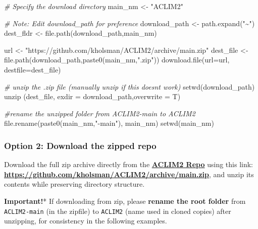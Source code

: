 \documentclass[
]{article}
\newenvironment{Shaded}{\begin{snugshade}}{\end{snugshade}}
\newcommand{\AttributeTok}[1]{\textcolor[rgb]{0.77,0.63,0.00}{#1}}
\newcommand{\CommentTok}[1]{\textcolor[rgb]{0.56,0.35,0.01}{\textit{#1}}}
\newcommand{\FunctionTok}[1]{\textcolor[rgb]{0.00,0.00,0.00}{#1}}
\newcommand{\NormalTok}[1]{#1}
\newcommand{\OtherTok}[1]{\textcolor[rgb]{0.56,0.35,0.01}{#1}}
\newcommand{\StringTok}[1]{\textcolor[rgb]{0.31,0.60,0.02}{#1}}
\begin{document}
\begin{Shaded}
\begin{Highlighting}[]
    \CommentTok{\# Specify the download directory}
\NormalTok{    main\_nm       }\OtherTok{\textless{}{-}} \StringTok{"ACLIM2"}

    \CommentTok{\# Note: Edit download\_path for preference}
\NormalTok{    download\_path }\OtherTok{\textless{}{-}}  \FunctionTok{path.expand}\NormalTok{(}\StringTok{"\textasciitilde{}"}\NormalTok{)}
\NormalTok{    dest\_fldr     }\OtherTok{\textless{}{-}} \FunctionTok{file.path}\NormalTok{(download\_path,main\_nm)}
    
\NormalTok{    url           }\OtherTok{\textless{}{-}} \StringTok{"https://github.com/kholsman/ACLIM2/archive/main.zip"}
\NormalTok{    dest\_file     }\OtherTok{\textless{}{-}} \FunctionTok{file.path}\NormalTok{(download\_path,}\FunctionTok{paste0}\NormalTok{(main\_nm,}\StringTok{".zip"}\NormalTok{))}
    \FunctionTok{download.file}\NormalTok{(}\AttributeTok{url=}\NormalTok{url, }\AttributeTok{destfile=}\NormalTok{dest\_file)}
    
    \CommentTok{\# unzip the .zip file (manually unzip if this doesn\textquotesingle{}t work)}
    \FunctionTok{setwd}\NormalTok{(download\_path)}
    \FunctionTok{unzip}\NormalTok{ (dest\_file, }\AttributeTok{exdir =}\NormalTok{ download\_path,}\AttributeTok{overwrite =}\NormalTok{ T)}
    
    \CommentTok{\#rename the unzipped folder from ACLIM2{-}main to ACLIM2}
    \FunctionTok{file.rename}\NormalTok{(}\FunctionTok{paste0}\NormalTok{(main\_nm,}\StringTok{"{-}main"}\NormalTok{), main\_nm)}
    \FunctionTok{setwd}\NormalTok{(main\_nm)}
\end{Highlighting}
\end{Shaded}

\hypertarget{option-2-download-the-zipped-repo}{%
\subsubsection{Option 2: Download the zipped
repo}\label{option-2-download-the-zipped-repo}}

Download the full zip archive directly from the
\href{https://github.com/kholsman/ACLIM2}{\textbf{ACLIM2 Repo}} using
this link:
\href{https://github.com/kholsman/ACLIM2/archive/main.zip}{\textbf{https://github.com/kholsman/ACLIM2/archive/main.zip}},
and unzip its contents while preserving directory structure.

\textbf{Important!}* If downloading from zip, please \textbf{rename the
root folder} from \texttt{ACLIM2-main} (in the zipfile) to
\texttt{ACLIM2} (name used in cloned copies) after unzipping, for
consistency in the following examples.
\end{document}
